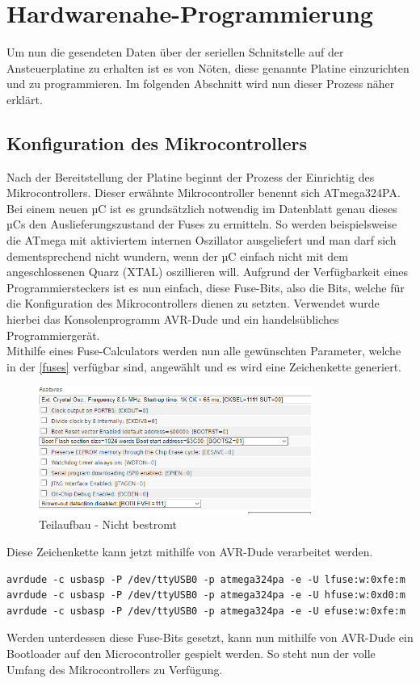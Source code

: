\section{Hardwarenahe-Programmierung}
Um nun die gesendeten Daten über der seriellen Schnitstelle auf der Ansteuerplatine zu erhalten ist es von Nöten, diese genannte Platine einzurichten und zu programmieren.
Im folgenden Abschnitt wird nun dieser Prozess näher erklärt.
\subsection{Konfiguration des Mikrocontrollers}
Nach der Bereitstellung der Platine beginnt der Prozess der Einrichtig des Mikrocontrollers.
Dieser erwähnte Mikrocontroller benennt sich ATmega324PA.
Bei einem neuen µC ist es grundsätzlich notwendig im Datenblatt genau dieses µCs den Auslieferungszustand der Fuses zu ermitteln.
So werden beispielsweise die ATmega mit aktiviertem internen Oszillator ausgeliefert und man darf sich dementsprechend nicht wundern, wenn der µC einfach nicht mit dem angeschlossenen Quarz (XTAL) oszillieren will.
Aufgrund der Verfügbarkeit eines Programmiersteckers ist es nun einfach, diese Fuse-Bits, also die Bits, welche für die Konfiguration des Mikrocontrollers dienen zu setzten.
Verwendet wurde hierbei das Konsolenprogramm AVR-Dude und ein handelsübliches Programmiergerät.\\
Mithilfe eines Fuse-Calculators werden nun alle gewünschten Parameter, welche in der \autoref{fuses} verfügbar sind, angewählt und es wird eine Zeichenkette generiert.
\begin{figure}[H]
\centering
\includegraphics[width=0.8\textwidth]{fig/ainf/Features.png}
\caption{Teilaufbau - Nicht bestromt}
\label{fuses}
\end{figure}
Diese Zeichenkette kann jetzt mithilfe von AVR-Dude verarbeitet werden.
\begin{lstlisting}[style=java,caption=Java-Codebeispiel,label=resource]
avrdude -c usbasp -P /dev/ttyUSB0 -p atmega324pa -e -U lfuse:w:0xfe:m
avrdude -c usbasp -P /dev/ttyUSB0 -p atmega324pa -e -U hfuse:w:0xd0:m
avrdude -c usbasp -P /dev/ttyUSB0 -p atmega324pa -e -U efuse:w:0xfe:m
\end{lstlisting}
Werden unterdessen diese Fuse-Bits gesetzt, kann nun mithilfe von AVR-Dude ein Bootloader auf den Microcontroller gespielt werden.
So steht nun der volle Umfang des Mikrocontrollers zu Verfügung.\\\\
